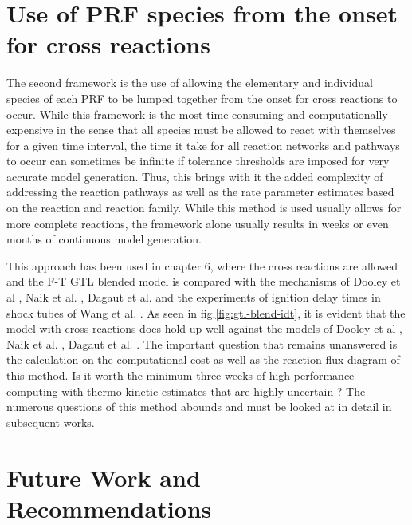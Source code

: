 \section{Use of PRF species from the onset for cross reactions}

The second framework is the use of allowing the elementary and individual species of each PRF to be lumped together from the onset for cross reactions to occur. While this framework is the most time consuming and computationally expensive in the sense that all species must be allowed to react with themselves for a given time interval, the time it take for all reaction networks and pathways to occur can sometimes be infinite if tolerance thresholds are imposed for very accurate model generation. Thus, this brings with it the added complexity of addressing the reaction pathways as well as the rate parameter estimates based on the reaction and reaction family. While this method is used usually allows for more complete reactions, the framework alone usually results in weeks or even months of continuous model generation. 

This approach has been used in chapter 6, where the cross reactions are allowed and the F-T GTL blended model is compared with the mechanisms of Dooley et al \cite{Dooley2010AProperties}, Naik et al. \cite{Naik2011DetailedFuels}, Dagaut et al. \cite{Dagaut2014} and the experiments of ignition delay times in shock tubes of Wang et al. \cite{Wang2012}. As seen in fig.\ref{fig:gtl-blend-idt}, it is evident that the model with cross-reactions does hold up well against the models of Dooley et al \cite{Dooley2010AProperties}, Naik et al. \cite{Naik2011DetailedFuels}, Dagaut et al. \cite{Dagaut2014}. The important question that remains unanswered is the calculation on the computational cost as well as the reaction flux diagram of this method. Is it worth the minimum three weeks of high-performance computing with thermo-kinetic estimates that are highly uncertain ? The numerous questions of this method abounds and must be looked at in detail in subsequent works.

\section{Future Work and Recommendations}

